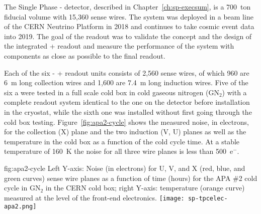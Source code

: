The Single Phase - detector, described 
in Chapter~\ref{ch:sp-execsum}, is a 700~ton fiducial volume 
 with 15,360 sense wires.
The system was deployed in a beam line of the CERN Neutrino Platform 
in 2018 and continues to take cosmic event data into 2019. The goal of 
the   readout was to validate the concept 
and the design of the integrated + readout 
and measure the performance of the  system with components 
as close as possible to the final   readout.

Each of the six - +
readout units consists of 2,560 sense wires, of which 960 are \SI{6}{m} 
long collection wires and 1,600 are \SI{7.4}{m} long induction wires. 
Five of the six a were tested in a full scale cold box in 
cold gaseous nitrogen (GN$_2$) with a complete  readout system 
identical to the one on the detector before installation in the cryostat,
while the sixth one was installed without first going through the cold
box testing. Figure~\ref{fig:apa2-cycle} shows the measured noise, in 
electrons, for the collection (X) plane and the two induction (V, U) 
planes as well as the  temperature in the cold box as a 
function of the cold cycle time. At a stable temperature of 
\SI{160}{K} the noise for all three wire planes is less than 500~e$^-$.

\begin{dunefigure}
{fig:apa2-cycle}
{Left Y-axis: Noise (in electrons) for U, V, and X (red, blue, and green 
curves) sense wire planes as a function of time (hours) for the APA \#2 cold 
cycle in GN$_2$ in the CERN cold box; right Y-axis: temperature 
(orange curve) measured at the level of the front-end electronics.}
\texttt{[image: sp-tpcelec-apa2.png]}
\end{dunefigure}

